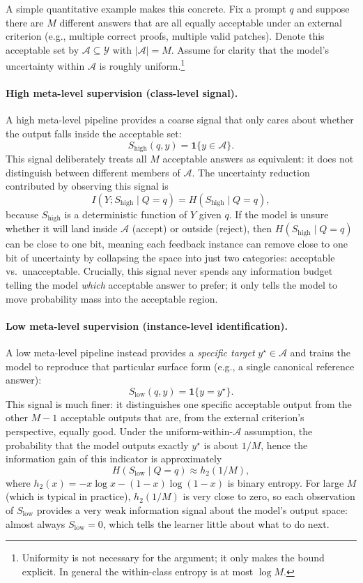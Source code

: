 \documentclass{article}
\theoremstyle{plain}
\theoremstyle{definition}
\theoremstyle{remark}
\begin{document}
A simple quantitative example makes this concrete. Fix a prompt $q$ and suppose there are $M$ different answers that are all equally acceptable under an external criterion (e.g., multiple correct proofs, multiple valid patches). Denote this acceptable set by $\mathcal{A}\subseteq\mathcal{Y}$ with $|\mathcal{A}|=M$. Assume for clarity that the model's uncertainty within $\mathcal{A}$ is roughly uniform.\footnote{Uniformity is not necessary for the argument; it only makes the bound explicit. In general the within-class entropy is at most $\log M$.}

\paragraph{High meta-level supervision (class-level signal).}
A high meta-level pipeline provides a coarse signal that only cares about whether the output falls inside the acceptable set:
\[
S_{\mathrm{high}}(q,y) = \mathbf{1}\{y\in\mathcal{A}\}.
\]
This signal deliberately treats all $M$ acceptable answers as equivalent: it does not distinguish between different members of $\mathcal{A}$. The uncertainty reduction contributed by observing this signal is
\[
I(Y;S_{\mathrm{high}} \mid Q{=}q) = H(S_{\mathrm{high}} \mid Q{=}q),
\]
because $S_{\mathrm{high}}$ is a deterministic function of $Y$ given $q$. If the model is unsure whether it will land inside $\mathcal{A}$ (accept) or outside (reject), then $H(S_{\mathrm{high}} \mid Q{=}q)$ can be close to one bit, meaning each feedback instance can remove close to one bit of uncertainty by collapsing the space into just two categories: acceptable vs.\ unacceptable. Crucially, this signal never spends any information budget telling the model \textit{which} acceptable answer to prefer; it only tells the model to move probability mass into the acceptable region.

\paragraph{Low meta-level supervision (instance-level identification).}
A low meta-level pipeline instead provides a \textit{specific target} $y^\star\in\mathcal{A}$ and trains the model to reproduce that particular surface form (e.g., a single canonical reference answer):
\[
S_{\mathrm{low}}(q,y) = \mathbf{1}\{y=y^\star\}.
\]
This signal is much finer: it distinguishes one specific acceptable output from the other $M-1$ acceptable outputs that are, from the external criterion's perspective, equally good. Under the uniform-within-$\mathcal{A}$ assumption, the probability that the model outputs exactly $y^\star$ is about $1/M$, hence the information gain of this indicator is approximately
\[
H(S_{\mathrm{low}} \mid Q{=}q) \approx  h_2(1/M),
\]
where $h_2(x)= -x\log x - (1{-}x)\log(1{-}x)$ is binary entropy. For large $M$ (which is typical in practice), $h_2(1/M)$ is very close to zero, so each observation of $S_{\mathrm{low}}$ provides a very weak information signal about the model's output space: almost always $S_{\mathrm{low}}=0$, which tells the learner little about what to do next.
\end{document}
